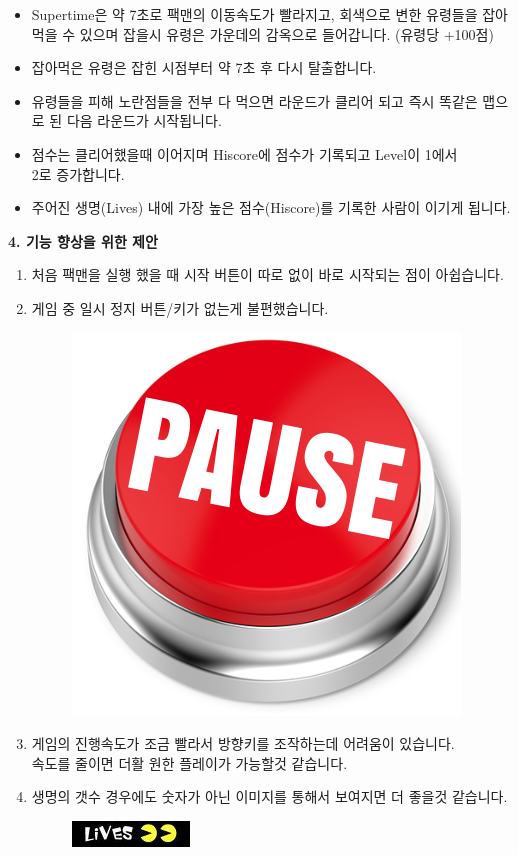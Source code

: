 \documentclass{article}
\begin{document}
\begin{itemize}
\item Supertime은 약 7초로 팩맨의 이동속도가 빨라지고, 회색으로 변한 유령들을 잡아먹을 수 있으며 잡을시 유령은 가운데의 감옥으로 들어갑니다. (유령당 +100점)
\item 잡아먹은 유령은 잡힌 시점부터 약 7초 후 다시 탈출합니다.
\item 유령들을 피해 노란점들을 전부 다 먹으면 라운드가 클리어 되고 즉시 똑같은 맵으로 된 다음 라운드가 시작됩니다.
\item 점수는 클리어했을때 이어지며 Hiscore에 점수가 기록되고 Level이 1에서\\ 2로 증가합니다.
\item 주어진 생명(Lives) 내에 가장 높은 점수(Hiscore)를 기록한 사람이 이기게 됩니다.
\end{itemize}

\newpage
\begin{large}\textbf{4. 기능 향상을 위한 제안}\end{large}
\begin{enumerate}
\item 처음 팩맨을 실행 했을 때 시작 버튼이 따로 없이 바로 시작되는 점이 아쉽습니다.
\item 게임 중 일시 정지 버튼/키가 없는게 불편했습니다.

 \begin{figure}[!h]
\centering
\includegraphics[width=0.35\columnwidth]{pause}
\end{figure}

\item 게임의 진행속도가 조금 빨라서 방향키를 조작하는데 어려움이 있습니다.\\ 속도를 줄이면 더활 원한 플레이가 가능할것 같습니다.
\item 생명의 갯수 경우에도 숫자가 아닌 이미지를 통해서 보여지면 더 좋을것 같습니다.
 \begin{figure}[!h]
\centering
\includegraphics[width=0.5\columnwidth]{lives}
\end{figure}
\end{enumerate}
\end{document}
